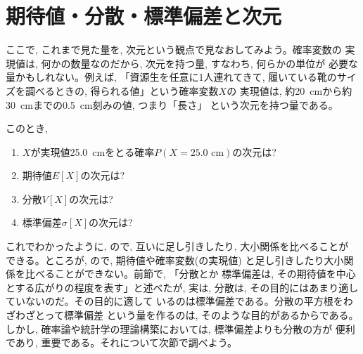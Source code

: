\section{期待値・分散・標準偏差と次元}\label{sect:stat_EVS_dim}

ここで, これまで見た量を, 次元という観点で見なおしてみよう。確率変数の
実現値は, 何かの数量なのだから, 次元を持つ量, すなわち, 何らかの単位が
必要な量かもしれない。例えば, 「資源生を任意に1人連れてきて, 
履いている靴のサイズを調べるときの, 得られる値」という確率変数$X$の
実現値は, 約20~cmから約30~cmまでの0.5~cm刻みの値, つまり「長さ」
という次元を持つ量である。

\begin{q}\label{q:stat_EVS_dim} このとき, 
\begin{enumerate}
\item $X$が実現値25.0~cmをとる確率$P(X=\text{25.0~cm})$の次元は?
\item 期待値$E[X]$の次元は?
\item 分散$V[X]$の次元は?
\item 標準偏差$\sigma[X]$の次元は?
\end{enumerate}\end{q}

これでわかったように, ので, 互いに足し引きしたり, 大小関係を比べることが
できる。ところが, ので, 期待値や確率変数(の実現値)
と足し引きしたり大小関係を比べることができない。前節で, 「分散とか
標準偏差は, その期待値を中心とする広がりの程度を表す」と述べたが, 
実は, 分散は, その目的にはあまり適していないのだ。その目的に適して
いるのは標準偏差である。分散の平方根をわざわざとって標準偏差
という量を作るのは, そのような目的があるからである。しかし, 
確率論や統計学の理論構築においては, 標準偏差よりも分散の方が
便利であり, 重要である。それについて次節で調べよう。\\


